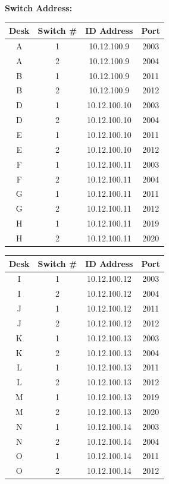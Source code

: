 \documentclass[11pt]{article}
\begin{document}
\vspace{0.5em}
\noindent\textbf{Switch Address:}
\begin{center}
\begin{tabular}{@{}cccc@{}}
\toprule
\textbf{Desk} & \textbf{Switch \#} & \textbf{ID Address} & Port \\ \midrule
A & 1 & 10.12.100.9 & 2003\\
A & 2 & 10.12.100.9 & 2004\\
B & 1 & 10.12.100.9 & 2011\\
B & 2 & 10.12.100.9 & 2012\\
D & 1 & 10.12.100.10 & 2003\\
D & 2 & 10.12.100.10 & 2004\\
E & 1 & 10.12.100.10 & 2011\\
E & 2 & 10.12.100.10 & 2012\\
F & 1 & 10.12.100.11 & 2003\\
F & 2 & 10.12.100.11 & 2004\\
G & 1 & 10.12.100.11 & 2011\\
G & 2 & 10.12.100.11 & 2012\\
H & 1 & 10.12.100.11 & 2019\\
H & 2 & 10.12.100.11 & 2020\\
\bottomrule
\end{tabular}
\quad
\begin{tabular}{@{}cccc@{}}
\toprule
\textbf{Desk} & \textbf{Switch \#} & \textbf{ID Address} & Port \\ \midrule
I & 1 & 10.12.100.12 & 2003\\
I & 2 & 10.12.100.12 & 2004\\
J & 1 & 10.12.100.12 & 2011\\
J & 2 & 10.12.100.12 & 2012\\
K & 1 & 10.12.100.13 & 2003\\
K & 2 & 10.12.100.13 & 2004\\
L & 1 & 10.12.100.13 & 2011\\
L & 2 & 10.12.100.13 & 2012\\
M & 1 & 10.12.100.13 & 2019\\
M & 2 & 10.12.100.13 & 2020\\
N & 1 & 10.12.100.14 & 2003\\
N & 2 & 10.12.100.14 & 2004\\
O & 1 & 10.12.100.14 & 2011\\
O & 2 & 10.12.100.14 & 2012\\
\bottomrule
\end{tabular}
\end{center}
\end{document}
